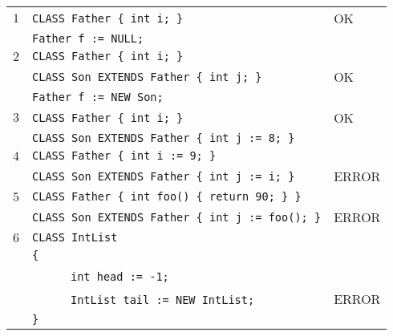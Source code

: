 \documentclass{article}
\begin{document}
\begin{table}[h]
\centering
\begin{tabular}{|l|l|l|}
\hline
 $1$ & \verb"CLASS Father { int i; }"             & OK \\
     & \verb"Father f := NULL;"                   &    \\
\hline
 $2$ & \verb"CLASS Father { int i; }"             &    \\
     & \verb"CLASS Son EXTENDS Father { int j; }" & OK \\
     & \verb"Father f := NEW Son;"                &    \\
\hline
 $3$ & \verb"CLASS Father { int i; }"                  & OK \\
     & \verb"CLASS Son EXTENDS Father { int j := 8; }" &    \\
\hline
 $4$ & \verb"CLASS Father { int i := 9; }"             &       \\
     & \verb"CLASS Son EXTENDS Father { int j := i; }" & ERROR \\
\hline
 $5$ & \verb"CLASS Father { int foo() { return 90; } }"    &       \\
     & \verb"CLASS Son EXTENDS Father { int j := foo(); }" & ERROR \\
\hline
 $6$ & \verb"CLASS IntList"                       &       \\
     & \verb"{"                                   &       \\
     & ~ ~ ~ ~\verb"int head := -1;"              &       \\
     & ~ ~ ~ ~\verb"IntList tail := NEW IntList;" & ERROR \\
     & \verb"}"                                   &       \\
\hline

\end{tabular}
\end{table}
\end{document}
